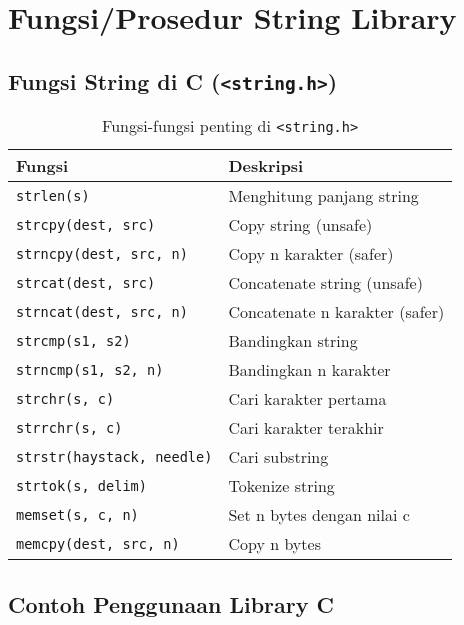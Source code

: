 \documentclass[../main.tex]{subfiles}
\begin{document}
\section{Fungsi/Prosedur String Library}

\subsection{Fungsi String di C (\texttt{<string.h>})}

\begin{table}[H]
  \centering
  \caption{Fungsi-fungsi penting di \texttt{<string.h>}}
  \begin{tabular}{@{}lp{8cm}@{}}
    \toprule
    Fungsi & Deskripsi \\
    \midrule
    \texttt{strlen(s)} & Menghitung panjang string \\
    \texttt{strcpy(dest, src)} & Copy string (unsafe) \\
    \texttt{strncpy(dest, src, n)} & Copy n karakter (safer) \\
    \texttt{strcat(dest, src)} & Concatenate string (unsafe) \\
    \texttt{strncat(dest, src, n)} & Concatenate n karakter (safer) \\
    \texttt{strcmp(s1, s2)} & Bandingkan string \\
    \texttt{strncmp(s1, s2, n)} & Bandingkan n karakter \\
    \texttt{strchr(s, c)} & Cari karakter pertama \\
    \texttt{strrchr(s, c)} & Cari karakter terakhir \\
    \texttt{strstr(haystack, needle)} & Cari substring \\
    \texttt{strtok(s, delim)} & Tokenize string \\
    \texttt{memset(s, c, n)} & Set n bytes dengan nilai c \\
    \texttt{memcpy(dest, src, n)} & Copy n bytes \\
    \bottomrule
  \end{tabular}
\end{table}

\subsection{Contoh Penggunaan Library C}
\end{document}
